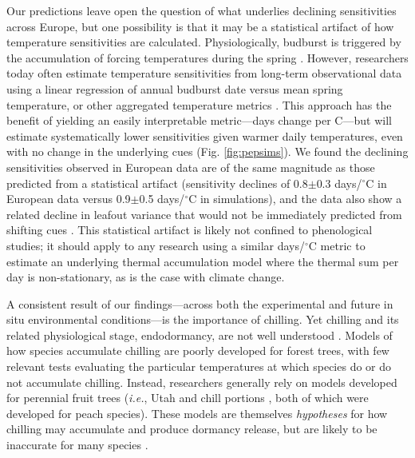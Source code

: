 \documentclass{article}
\begin{document}
\par Our predictions leave open the question of what underlies declining sensitivities across Europe, but one possibility is that it may be a statistical artifact of how temperature sensitivities are calculated.
Physiologically, budburst is triggered by the accumulation of forcing temperatures during the spring \emph{\citep{chuine2016,hanninen1995}}. However, researchers today often estimate temperature sensitivities from long-term observational data using a linear regression of annual budburst date versus mean spring temperature, or other aggregated temperature metrics \emph{\citep[e.g.,][]{Wolkovich:2012n}}. This approach has the benefit of yielding an easily interpretable metric---days change per \degree C---but will estimate systematically lower sensitivities given warmer daily temperatures, even with no change in the underlying cues (Fig. \ref{fig:pepsims}). We found the declining sensitivities observed in European data are of the same magnitude as those predicted from a statistical artifact (sensitivity declines of 0.8$\pm$0.3 days/$^{\circ}$C in European data versus 0.9$\pm$0.5 days/$^{\circ}$C in simulations), and the data also show a related decline in leafout variance that would not be immediately predicted from shifting cues \emph{\citep[{\normalfont see} Potential statistical artifacts in declines of temperature sensitivity in observational long-term data {\normalfont in the Supplemental Materials and}][{\normalfont for further details}]{gusewell2017}}. This statistical artifact is likely not confined to phenological studies; it should apply to any research using a similar days/$^{\circ}$C metric to estimate an underlying thermal accumulation model where the thermal sum per day is non-stationary, as is the case with climate change. 

\par A consistent result of our findings---across both the experimental and future in situ environmental conditions---is the importance of chilling. Yet chilling and its related physiological stage, endodormancy, are not well understood \emph{\citep{chuine2016}}. Models of how species accumulate chilling are poorly developed for forest trees, with few relevant tests evaluating the particular temperatures at which species do or do not accumulate chilling. Instead, researchers generally rely on models developed for perennial fruit trees (\emph{i.e.}, Utah \emph{\citep{richardson1974}} and chill portions \emph{\citep{fishman1987}}, both of which were developed for peach species). These models are themselves \emph{hypotheses} for how chilling may accumulate and produce dormancy release, but are likely to be inaccurate for many species \emph{\citep{dennis2003}}. 
\end{document}
